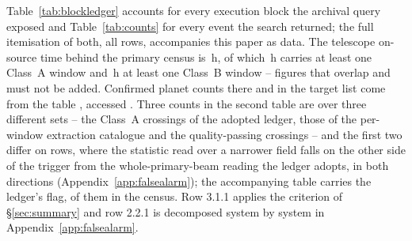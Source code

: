 Table~\ref{tab:blockledger} accounts for every execution block the archival
query exposed and Table~\ref{tab:counts} for every event the search returned;
the full itemisation of both, all \MtCountRows{} rows, accompanies this paper
as data. The telescope on-source time behind the primary census is
\StTelHours\,h, of which \StTelHoursFine\,h carries at least one Class~A
window and \StTelHoursCoarse\,h at least one Class~B window -- figures that
overlap and must not be added. Confirmed planet counts there and in the
target list come from the \SfHostCatalogue{} \SfHostTable{} table
\citep{NEA2013}, accessed \SfHostDate. Three counts in the second table are
\MtCrossA{} over three different sets -- the Class~A crossings of the adopted
ledger, those of the per-window extraction catalogue and the quality-passing
crossings -- and the first two differ on \FrNFlag{} rows, where the statistic
read over a narrower field falls on the other side of the trigger from the
whole-primary-beam reading the ledger adopts, in both directions
(Appendix~\ref{app:falsealarm}); the accompanying table carries the ledger's
flag, \MtCrossACen{} of them in the census. Row 3.1.1 applies the criterion
of \S\ref{sec:summary} and row 2.2.1 is decomposed system by system in
Appendix~\ref{app:falsealarm}.

\begin{table}
\centering
\scriptsize
\caption{\textbf{The survey ledger, part one: execution blocks and windows.}
Each row carries its own number, and a group sums to the row whose number
heads it. Hours are window-hours, so the classes partition the hours as they
partition the windows. Rows~3.2 to 3.5 are the archival gap, over which no
result is formed.}
\label{tab:blockledger}

\end{table}

